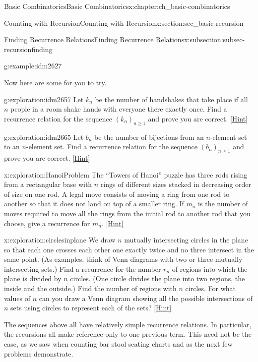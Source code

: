 \documentclass[oneside,10pt,]{book}
\numberwithin{equation}{chapter}
\begin{document}
\begin{chapterptx}{Basic Combinatorics}{}{Basic Combinatorics}{}{}{x:chapter:ch_basic-combinatorics}
\begin{sectionptx}{Counting with Recursion}{}{Counting with Recursion}{}{}{x:section:sec_basic-recursion}
\begin{subsectionptx}{Finding Recurrence Relations}{}{Finding Recurrence Relations}{}{}{x:subsection:subsec-recursionfinding}
\begin{example}{}{g:example:idm2627}
\end{example}
Now here are some for you to try.%
\begin{exploration}{}{g:exploration:idm2657}%
Let \(k_n\) be the number of handshakes that take place if all \(n\) people in a room shake hands with everyone there exactly once.  Find a recurrence relation for the sequence \((k_n)_{n \ge 1}\) and prove you are correct.%
\space\hspace*{0pt}\hfill{\tiny\hyperlink{g:hint:idm2663-back}{[Hint]}}\end{exploration}
\begin{exploration}{}{g:exploration:idm2665}%
Let \(b_n\) be the number of bijections from an \(n\)-element set to an \(n\)-element set.  Find a recurrence relation for the sequence \((b_n)_{n \ge 1}\) and prove you are correct.%
\space\hspace*{0pt}\hfill{\tiny\hyperlink{g:hint:idm2672-back}{[Hint]}}\end{exploration}
\begin{exploration}{}{x:exploration:HanoiProblem}%
The ``Towers of Hanoi'' puzzle has three rods rising from a rectangular base with \(n\) rings of different sizes stacked in decreasing order of size on one rod. A legal move consists of moving a ring from one rod to another so that it does not land on top of a smaller ring. If \(m_n\) is the number of moves required to move all the rings from the initial rod to another rod that you choose, give a recurrence for \(m_n\).%
\space\hspace*{0pt}\hfill{\tiny\hyperlink{g:hint:idm2683-back}{[Hint]}}\end{exploration}
\begin{exploration}{}{x:exploration:circlesinplane}%
We draw \(n\) mutually intersecting circles in the plane so that each one crosses each other one exactly twice and no three intersect in the same point. (As examples, think of Venn diagrams with two or three mutually intersecting sets.) Find a recurrence for the number \(r_n\) of regions into which the plane is divided by \(n\) circles. (One circle divides the plane into two regions, the inside and the outside.) Find the number of regions with \(n\) circles. For what values of \(n\) can you draw a Venn diagram showing all the possible intersections of \(n\) sets using circles to represent each of the sets?%
\space\hspace*{0pt}\hfill{\tiny\hyperlink{g:hint:idm2701-back}{[Hint]}}\end{exploration}
The sequences above all have relatively simple recurrence relations.  In particular, the recursions all make reference only to one previous term.  This need not be the case, as we saw when counting bar stool seating charts and as the next few problems demonstrate.%

\end{subsectionptx}
\end{sectionptx}
\end{chapterptx}
\end{document}
